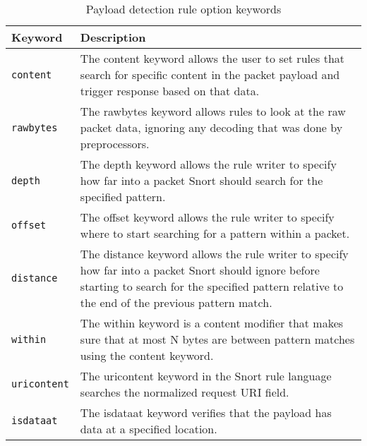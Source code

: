 \documentclass[english]{report}
\begin{document}
\begin{center}
\begin{longtable}[h]{| p{1in} | p{4.5in} |}
\caption{Payload detection rule option keywords} \\

\hline
Keyword & Description \\
\hline

\hline
\texttt{content} &

The content keyword allows the user to set rules that search for specific
content in the packet payload and trigger response based on that data. \\

\hline
\texttt{rawbytes} &

The rawbytes keyword allows rules to look at the raw packet data, ignoring any
decoding that was done by preprocessors. \\

\hline
\texttt{depth} &

The depth keyword allows the rule writer to specify how far into a packet Snort
should search for the specified pattern. \\

\hline
\texttt{offset} &

The offset keyword allows the rule writer to specify where to start searching
for a pattern within a packet. \\

\hline
\texttt{distance} &

The distance keyword allows the rule writer to specify how far into a packet
Snort should ignore before starting to search for the specified pattern
relative to the end of the previous pattern match. \\

\hline
\texttt{within} &

The within keyword is a content modifier that makes sure that at most N bytes
are between pattern matches using the content keyword. \\

\hline
\texttt{uricontent} &

The uricontent keyword in the Snort rule language searches the normalized
request URI field. \\

\hline
\texttt{isdataat} &

The isdataat keyword verifies that the payload has data at a specified
location. \\


\end{longtable}
\end{center}
\end{document}
